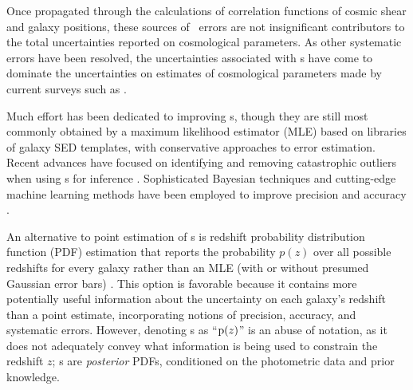 

Once propagated through the calculations of correlation functions of cosmic shear and galaxy positions, these sources of \pz\ errors are not insignificant contributors to the total uncertainties reported on cosmological parameters.
As other systematic errors have been resolved, the uncertainties associated with \pz s have come to dominate the uncertainties on estimates of cosmological parameters made by current surveys such as \des \citep{hoyle_dark_2017}.

Much effort has been dedicated to improving \pz s, though they are still most commonly obtained by a maximum likelihood estimator (MLE) based on libraries of galaxy SED templates, with conservative approaches to error estimation.  
Recent advances have focused on identifying and removing catastrophic outliers when using \pz s for 
inference \citep{Gorecki2014}.  
Sophisticated Bayesian techniques and cutting-edge machine learning methods have been employed to improve precision \citep{Carliles2010} and accuracy \citep{Sadeh2015}. 

An alternative to point estimation of \pz s is redshift probability distribution function (PDF) estimation that reports the probability $p(z)$ over all possible redshifts for every galaxy rather than an MLE (with or without presumed Gaussian error bars) \citep{Koo1999}.  
This option is favorable because it contains more potentially useful information about the uncertainty on each galaxy's redshift than a point estimate, incorporating notions of precision, accuracy, and systematic errors.
However, denoting \pzpdf s as ``$\mathrm{p}(z)$'' is an abuse of notation, as it does not adequately convey what information is being used to constrain the redshift $z$; \pzpdf s are \textit{posterior} PDFs, conditioned on the photometric data and prior knowledge.

